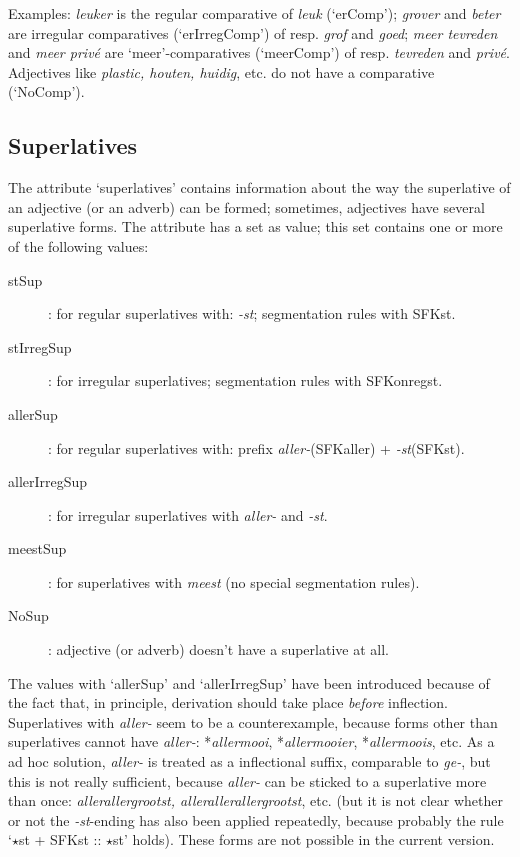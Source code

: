 Examples: {\em leuker} is the regular comparative of {\em leuk} (`erComp');
  {\em grover} and {\em beter} are irregular comparatives (`erIrregComp') 
  of resp. {\em grof} and {\em goed};
  {\em meer tevreden} and {\em meer priv\'{e}} are `meer'-comparatives 
  (`meerComp') of   resp. {\em tevreden} and {\em priv\'{e}}. 
  Adjectives like {\em plastic, houten, huidig}, etc. do not have a comparative 
  (`NoComp'). 


\subsection{Superlatives}

The attribute `superlatives' contains information about the way the 
superlative of an adjective (or an adverb) can be formed; sometimes, adjectives 
have several superlative forms. The attribute has a set as value; this set 
contains one or more of the following values: 

\begin{description}
  \item [stSup]: for regular superlatives with: {\em -st}; 
                 segmentation rules with SFKst.
  \item [stIrregSup]: for irregular superlatives; segmentation rules 
                 with SFKonregst.
  \item [allerSup]: for regular superlatives with: prefix 
                 {\em aller-}(SFKaller) + {\em -st}(SFKst).
  \item [allerIrregSup]: for irregular superlatives with {\em aller-} and 
                 {\em -st}.
  \item [meestSup]: for superlatives with {\em meest} (no special segmentation 
                 rules).
  \item [NoSup]: adjective (or adverb) doesn't have a superlative at all.
\end{description}

The values with `allerSup' and `allerIrregSup' have been introduced because
of the fact that, in principle, derivation should take place {\em before} 
inflection. Superlatives with {\em aller-} seem to be a counterexample,
because forms other than superlatives cannot have {\em aller-}:
*{\em allermooi}, *{\em allermooier}, *{\em allermoois}, etc.
As a ad hoc solution, {\em aller-} is treated as a inflectional suffix,
comparable to {\em ge-}, but this is not really sufficient, because 
{\em aller-} can be sticked to a superlative more than once:
{\em allerallergrootst, allerallerallergrootst}, etc. (but it is not clear 
whether or not the {\em -st}-ending has also been applied repeatedly,
because probably the rule `$\star$st + SFKst :: $\star$st' holds). 
These forms are not possible in the current version.

